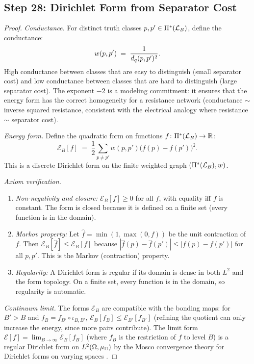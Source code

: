 
\subsection{Step 28: Dirichlet Form from Separator Cost}\label{app:step28}

\begin{proof}
\emph{Conductance.}  For distinct truth classes $p, p' \in \Pi^*(\mathcal{L}_B)$,
define the conductance:
\[
  w(p, p') \;=\; \frac{1}{d_q(p, p')^2}.
\]
High conductance between classes that are easy to distinguish (small
separator cost) and low conductance between classes that are hard to
distinguish (large separator cost).  The exponent $-2$ is a modeling
commitment: it ensures that the energy form has the correct homogeneity
for a resistance network (conductance $\sim$ inverse squared resistance,
consistent with the electrical analogy where resistance $\sim$ separator
cost).

\emph{Energy form.}  Define the quadratic form on functions
$f \colon \Pi^*(\mathcal{L}_B) \to \mathbb{R}$:
\[
  \mathcal{E}_B[f] \;=\;
  \frac{1}{2} \sum_{p \neq p'} w(p, p') \bigl(f(p) - f(p')\bigr)^2.
\]
This is a discrete Dirichlet form on the finite weighted graph
$(\Pi^*(\mathcal{L}_B), w)$.

\emph{Axiom verification.}
\begin{enumerate}[nosep, label=(E\arabic*)]
  \item \emph{Non-negativity and closure:}
        $\mathcal{E}_B[f] \geq 0$ for all $f$, with equality iff $f$ is
        constant.  The form is closed because it is defined on a finite
        set (every function is in the domain).
  \item \emph{Markov property:}  Let $\hat{f} = \min(1, \max(0, f))$ be
        the unit contraction of $f$.  Then
        $\mathcal{E}_B[\hat{f}] \leq \mathcal{E}_B[f]$ because
        $|\hat{f}(p) - \hat{f}(p')| \leq |f(p) - f(p')|$ for all
        $p, p'$.  This is the Markov (contraction) property.
  \item \emph{Regularity:}  A Dirichlet form is regular if its domain is
        dense in both $L^2$ and the form topology.  On a finite set, every
        function is in the domain, so regularity is automatic.
\end{enumerate}

\emph{Continuum limit.}  The forms $\mathcal{E}_B$ are compatible with
the bonding maps: for $B' > B$ and $f_B = f_{B'} \circ \iota_{B,B'}$,
$\mathcal{E}_B[f_B] \leq \mathcal{E}_{B'}[f_{B'}]$ (refining the quotient
can only increase the energy, since more pairs contribute).  The limit
form $\mathcal{E}[f] = \lim_{B \to \infty} \mathcal{E}_B[f_B]$ (where
$f_B$ is the restriction of $f$ to level $B$) is a regular Dirichlet
form on $L^2(\Omega, \mu_\Pi)$ by the Mosco convergence theory for
Dirichlet forms on varying spaces \citep{mosco1994}.


\end{proof}
